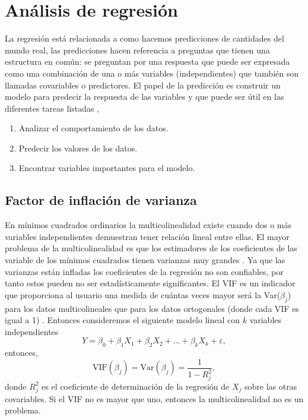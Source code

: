 \section{Análisis de regresión}
La regresión está relacionada a como hacemos predicciones de cantidades del mundo real, las predicciones hacen referencia a preguntas que tienen una estructura en común: se preguntan por una respuesta que puede ser expresada como una combinación de una o más variables (independientes) que también son llamadas covariables o predictores. El papel de la predicción es construir un modelo para predecir la respuesta de las variables y que puede ser útil en las diferentes tareas listadas \parencite{igualIntroductionDataScience2017}, 
\begin{enumerate}
	\item Analizar el comportamiento de los datos.
	\item Predecir los valores de los datos.
	\item Encontrar variables importantes para el modelo.
\end{enumerate}

\subsection{Factor de inflación de varianza}

En mínimos cuadrados ordinarios la multicolinealidad existe cuando dos o más variables independientes demuestran tener relación lineal entre ellas. El mayor problema de la multicolinealidad es que los estimadores de los coeficientes de las variable de los mínimos cuadrados tienen varianzas muy grandes \parencite{mansfieldDetectingMulticollinearity1982}. Ya que las varianzas están infladas los coeficientes de la regresión no son confiables, por tanto
estos pueden no ser estadísticamente significantes.  El VIF es un indicador que proporciona al usuario una medida de cuántas veces mayor será la Var($\beta_j$) para los datos multicolineales que para los datos ortogonales (donde cada VIF es igual a 1) \parencite{mansfieldDetectingMulticollinearity1982}. Entonces consideremos el siguiente modelo lineal con $k$ variables independientes 
\[
Y=\beta_{0}+\beta_{1} X_{1}+\beta_{2} X_{2}+\ldots+\beta_{k} X_{k}+\varepsilon,
\]
entonces,
\[
\text{VIF}(\beta_j) = \text{Var}(\beta_j) = \frac{1}{1-R_{j}^{2}},
\]
donde $R^2_j$ es el coeficiente de determinación de la regresión de $X_j$ sobre las otras covariables. Si el VIF no es mayor que uno, entonces la multicolinealidad no es un problema.

